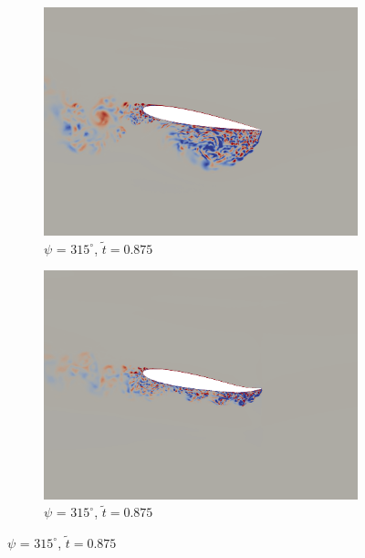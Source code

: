 \begin{figure}[H]
	\begin{subfigure}[b]{0.4\textwidth}
		\centering
		\includegraphics[width=1\textwidth]{figures/mu_2pt0/vorticity/baseline/phase_315.png}
		\caption{ $\psi$ = $315^\circ$, $\tilde{t}=0.875$}
		\label{fig:mu_2pt0_baseline_psi315}
	\end{subfigure}
	\begin{subfigure}[b]{0.4\textwidth}
		\centering
		\includegraphics[width=1\textwidth]{figures/mu_2pt0/vorticity/AC/phase_315.png}
		\caption{ $\psi$ = $315^\circ$, $\tilde{t}=0.875$}
		\label{fig:mu_2pt0_AC_psi315}
	\end{subfigure}
	
	

\end{figure}
